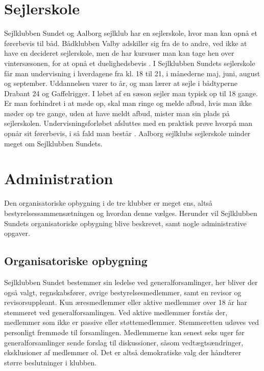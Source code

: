 \section{Sejlerskole}\label{sec:sejlerskole}

Sejlklubben Sundet og Aalborg sejlklub har en sejlerskole, hvor man kan opnå et førerbevis til båd. Bådklubben Valby
adskiller sig fra de to andre, ved ikke at have en decideret sejlerskole, men de har kursuser man kan tage hen over
vintersæsonen, for at opnå et duelighedsbevis \citep{baedklubben_valby_duelighedsbevis}. \newline 
I Sejlklubben Sundets sejlerskole får man undervisning i hverdagene fra kl. 18 til 21, i månederne maj, juni, august og
september. Uddannelsen varer to år, og man lærer at sejle i bådtyperne Drabant 24 og Gaffelrigger. I løbet af en sæson
sejler man typisk op til 18 gange. Er man forhindret i at møde op, skal man ringe og melde afbud, hvis man ikke møder op
tre gange, uden at have meldt afbud, mister man sin plads på sejlerskolen. Undervisningsforløbet afsluttes med en
praktisk prøve hvorpå man opnår sit førerbevis, i så fald man består \citep{Sundet}. Aalborg sejlklubs sejlerskole
minder meget om Sejlklubben Sundets.


\section{Administration}\label{sec:organisatoriske-opbygning}

Den organisatoriske opbygning i de tre klubber er meget ens, altså bestyrelsessammensætningen og hvordan denne vælges. 
Herunder vil Sejlklubben Sundets organisatoriske opbygning blive beskrevet, samt nogle administrative opgaver.


\subsection{Organisatoriske opbygning}\label{subsec:organisatoriske-opbygning}

Sejlklubben Sundet bestemmer sin ledelse ved generalforsamlinger, her bliver der også valgt, regnskabsfører, øvrige
bestyrelsesmedlemmer, samt en revisor og revisorsuppleant. Kun æresmedlemmer eller aktive medlemmer over 18 år har
stemmeret ved generalforsamlingen. Ved aktive medlemmer forstås der, medlemmer som ikke er passive eller
støttemedlemmer. Stemmeretten udøves ved personligt fremmøde til forsamlingen. Medlemmerne kan senest seks uger før
generalforsamlinger sende forslag til diskussioner, såsom vedtægtsændringer, eksklusioner af medlemmer ol. Det er altså
demokratiske valg der håndterer større beslutninger i klubben.


